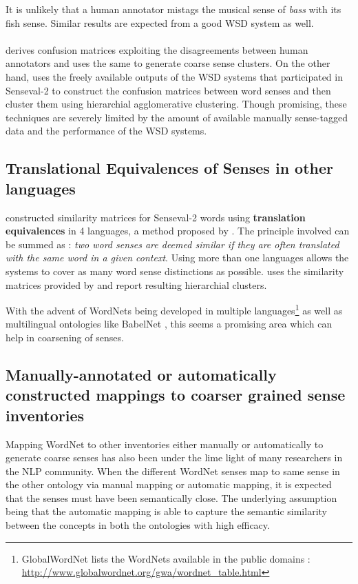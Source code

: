 It is unlikely that a human annotator mistags the musical sense of \textit{bass} with its fish sense. Similar results are expected from a good WSD system as well.

\paragraph{}
\citep{chklovski2003exploiting} derives confusion matrices exploiting the disagreements between human annotators and uses the same to generate coarse sense clusters. On the other hand, \citep{agirre2003clustering} uses the freely available outputs of the WSD systems that participated in Senseval-2 \citep{Edmonds:2001} to construct the confusion matrices between word senses and then cluster them using hierarchial agglomerative clustering. Though promising, these techniques are severely limited by the amount of available manually sense-tagged data and the performance of the WSD systems.

\subsection{Translational Equivalences of Senses in other languages}
\citep{chugur2002polysemy} constructed similarity matrices for Senseval-2 \citep{Edmonds:2001} words using \textbf{translation equivalences} in 4 languages, a method proposed by \citep{resnik1999distinguishing}.
The principle involved can be summed as : \textit{two word senses are deemed similar if they are often translated with the same word in a given context}. Using more than one languages allows the systems to cover as many word sense distinctions as possible. \citep{agirre2003clustering} uses the similarity matrices provided by \citep{chugur2002polysemy} and report resulting hierarchial clusters.

With the advent of WordNets being developed in multiple languages\footnote{GlobalWordNet lists the WordNets available in the public domains : \url{http://www.globalwordnet.org/gwa/wordnet_table.html}} as well as multilingual ontologies like BabelNet \citep{NavigliPonzetto:12aij}, this seems a promising area which can help in coarsening of senses.


\subsection{Manually-annotated or automatically constructed mappings to coarser grained sense inventories}
Mapping WordNet to other inventories either manually or automatically to generate coarse senses has also been under the lime light of many researchers in the NLP community. When the different WordNet senses map to same sense in the other ontology via manual mapping or automatic mapping, it is expected that the senses must have been semantically close. The underlying assumption being that the automatic mapping is able to capture the semantic similarity between the concepts in both the ontologies with high efficacy.

